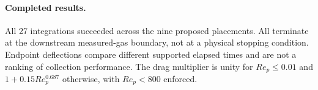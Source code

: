 \paragraph{Completed results.} All 27 integrations succeeded across the nine
proposed placements. All terminate at the downstream measured-gas boundary,
not at a physical stopping condition. Endpoint deflections compare different
supported elapsed times and are not a ranking of collection performance.
The drag multiplier is unity for $Re_p\leq0.01$ and
$1+0.15Re_p^{0.687}$ otherwise, with $Re_p<800$ enforced.
